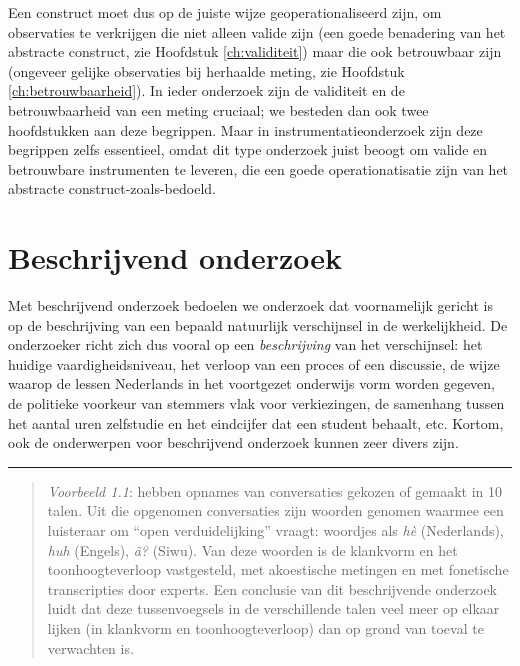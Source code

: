 \documentclass[
]{book}
\begin{document}
Een construct moet dus op de juiste wijze geoperationaliseerd zijn, om
observaties te verkrijgen die niet alleen valide zijn (een goede
benadering van het abstracte construct, zie Hoofdstuk \ref{ch:validiteit})
maar die ook betrouwbaar zijn (ongeveer
gelijke observaties bij herhaalde meting, zie
Hoofdstuk \ref{ch:betrouwbaarheid}).
In ieder onderzoek zijn de validiteit
en de betrouwbaarheid van een meting cruciaal; we besteden dan ook twee hoofdstukken aan deze begrippen.
Maar in instrumentatieonderzoek zijn
deze begrippen zelfs essentieel, omdat dit type onderzoek juist beoogt
om valide en betrouwbare instrumenten te leveren, die een goede
operationatisatie zijn van het abstracte construct-zoals-bedoeld.

\hypertarget{sec:beschrijvend-onderzoek}{%
\section{Beschrijvend onderzoek}\label{sec:beschrijvend-onderzoek}}

Met beschrijvend onderzoek bedoelen we onderzoek dat voornamelijk
gericht is op de beschrijving van een bepaald natuurlijk verschijnsel in
de werkelijkheid. De onderzoeker richt zich dus vooral op een
\emph{beschrijving} van het verschijnsel: het huidige vaardigheidsniveau, het
verloop van een proces of een discussie, de wijze waarop de lessen
Nederlands in het voortgezet onderwijs vorm worden gegeven, de politieke
voorkeur van stemmers vlak voor verkiezingen, de samenhang tussen het
aantal uren zelfstudie en het eindcijfer dat een student behaalt, etc.
Kortom, ook de onderwerpen voor beschrijvend onderzoek kunnen zeer
divers zijn.

\begin{center}\rule{0.5\linewidth}{0.5pt}\end{center}

\begin{quote}
\emph{Voorbeeld 1.1}: \citep{DTE13} hebben opnames van conversaties gekozen of gemaakt in 10 talen. Uit die opgenomen conversaties zijn woorden genomen waarmee een luisteraar om
``open verduidelijking'' vraagt: woordjes als \emph{hè} (Nederlands), \emph{huh}
(Engels), \emph{ã?} (Siwu). Van deze woorden is de klankvorm en het
toonhoogteverloop vastgesteld, met akoestische metingen en met
fonetische transcripties door experts. Een conclusie van dit
beschrijvende onderzoek luidt dat deze tussenvoegsels in de
verschillende talen veel meer op elkaar lijken (in klankvorm en
toonhoogteverloop) dan op grond van toeval te verwachten is.
\end{quote}
\end{document}
